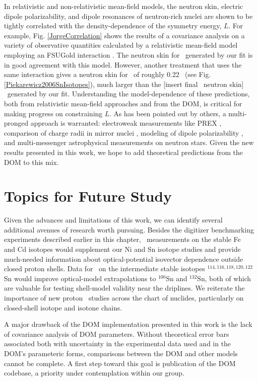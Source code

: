 In relativistic and non-relativistic mean-field models, the neutron skin,
electric dipole polarizability, and dipole resonances of neutron-rich nuclei are
shown to be tightly correlated with the density-dependence of the symmetry
energy, $L$. For example, Fig. \ref{JorgeCorrelation} shows the results of a covariance
analysis on a variety of observative quantities calculated by a relativistic mean-field model 
employing an FSUGold interaction \cite{Fattoyev2012, NewJorgePaper}. The neutron
skin for \pbEight\ generated by our fit is in good agreement with this model.
However, another treatment that uses the same interaction
\cite{Piekarewicz2006} gives a neutron skin for \snFour\ of roughly 0.22
\femto\meter\ (see Fig. \ref{Piekarewicz2006SnIsotopes}), much larger than the
[insert final \snFour\ neutron skin] \femto\meter\ generated by our fit.
Understanding the model-dependence of these predictions, both from relativistic mean-field
approaches and from the DOM, is critical for making progress on constraining
$L$. As has been pointed out by others, a multi-pronged approach 
is warranted: electroweak measurements like PREX \cite{Horowitz2014}, comparison of
charge radii in mirror nuclei \cite{Brown2017}, modeling of dipole
polarizability \cite{Piekarewicz2006}, and multi-messenger astrophysical
measurements on neutron stars. Given the new results presented in this work, we
hope to add theoretical predictions from the DOM to this mix.

\section{Topics for Future Study}
Given the advances and limitations of this work, we can identify several
additional avenues of research worth pursuing.
Besides the digitizer benchmarking experiments described earlier
in this chapter, \tot\ measurements on the stable Fe and Cd isotopes would
supplement our Ni and Sn isotope studies and provide much-needed information
about optical-potential isovector dependence outside closed proton shells.
Data for \tot\ on the intermediate stable isotopes $^{114,116,118,120,122}$Sn
would improve optical-model extrapolations to $^{100}$Sn and $^{132}$Sn,
both of which are valuable for testing shell-model validity near the driplines.
We reiterate the importance of new proton \rxn\
studies across the chart of nuclides, particularly on closed-shell isotope and isotone
chains. 

A major drawback of the DOM implementation presented in this work is
the lack of covariance analysis of DOM parameters. Without theoretical error
bars associated both with uncertainty in the experimental data used and in the
DOM's parameteric forms, comparisons between the DOM and other models cannot be
complete. A first step toward this goal is publication of the DOM codebase, a
priority under contemplation within our group.
